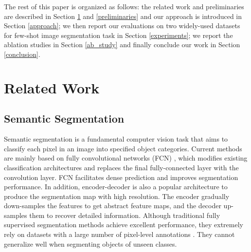 \documentclass[journal]{IEEEtran}
\begin{document}
The rest of this paper is organized as follows: 
the related work and preliminaries are described in Section \ref{related_work} and \ref{preliminaries} and our approach is introduced in Section \ref{approach}; we then report our evaluations on two widely-used datasets for few-shot image segmentation task in Section \ref{experiments}; we report the ablation studies in Section \ref{ab_study} and finally conclude our work in Section \ref{conclusion}.
	

\section{Related Work}
\label{related_work}

\subsection{Semantic Segmentation}
Semantic segmentation \cite{pei2022hierarchical, long2015fully} is a fundamental computer vision task that aims to classify each pixel in an image into specified object categories. Current methods are mainly based on fully convolutional networks (FCN) \cite{long2015fully}, which modifies existing classification architectures and replaces the final fully-connected layer with the convolution layer. FCN facilitates dense prediction and improves segmentation performance. In addition, encoder-decoder \cite{badrinarayanan2017segnet} is also a popular architecture to produce the segmentation map with high resolution. The encoder gradually down-samples the features to get abstract feature maps, and the decoder up-samples them to recover detailed information. Although traditional fully supervised segmentation methods achieve excellent performance, they extremely rely on datasets with a large number of pixel-level annotations \cite{everingham2015pascal}. They cannot generalize well when segmenting objects of unseen classes.
\end{document}
